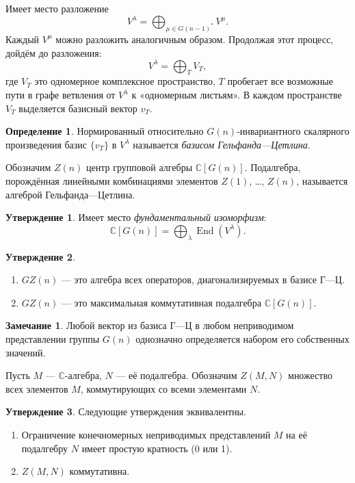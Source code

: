 \documentclass[12pt]{article}%
\renewcommand{\C}{\ensuremath{\mathbb C}}
\DeclareMathOperator{\Endo}{End}
\newcommand{\rep}[1]{#1^*}
\theoremstyle{remark}
\theoremstyle{definition}
\newtheorem{Prop}{Утверждение}
\newtheorem*{Remark}{Замечание}
\newtheorem{Def}{Определение}[section]
\begin{document}
Имеет место разложение
\[
    V^\lambda = \bigoplus_{\mu \in \rep{G(n-1)}} V^{\mu}.
\]
Каждый $V^{\mu}$ можно разложить аналогичным образом. Продолжая этот процесс,
дойдём до разложения:
\[
    V^\lambda = \bigoplus_{T}V_T,
\]
где $V_T$ это одномерное комплексное пространство, $T$ пробегает все возможные
пути в графе ветвления от $V^\lambda$ к «одномерным листьям». В каждом
пространстве $V_T$ выделяется базисный вектор $v_T$.

\begin{Def}
Нормированный относительно $G(n)$-инвариантного скалярного произведения базис
$\{v_T\}$ в $V^\lambda$ называется \emph{базисом Гельфанда—Цетлина}.
\end{Def}

Обозначим $Z(n)$ центр групповой алгебры $\C[G(n)]$. Подалгебра, порождённая
линейными комбинациями элементов $Z(1)$, \ldots , $Z(n)$, называется
алгеброй Гельфанда—Цетлина.

\begin{Prop}
Имеет место \emph{фундаментальный изоморфизм}:
\[
    \C[G(n)] = \bigoplus_{\lambda} \Endo(V^\lambda).
\]
\end{Prop}

\begin{Prop}
\begin{enumerate} $GZ(n)$ имеет следующие характеризации:  
  \item $GZ(n)$ — это алгебра всех операторов, диагонализируемых в базисе Г—Ц.
  
  \item $GZ(n)$ — это максимальная коммутативная подалгебра $\C[G(n)]$. 
\end{enumerate}
\end{Prop}

\begin{Remark}
Любой вектор из базиса Г—Ц в любом неприводимом представлении группы
$G(n)$ однозначно определяется набором его собственных значений.
\end{Remark}


Пусть $M$ — $\C$-алгебра, $N$ — её подалгебра. Обозначим $Z(M,N)$ множество всех
элементов $M$, коммутирующих со всеми элементами $N$.

\begin{Prop}
Следующие утверждения эквивалентны.
\begin{enumerate}
  \item Ограничение конечномерных неприводимых представлений $M$ на её
  подалгебру $N$ имеет простую кратность (0 или 1).
  \item $Z(M,N)$ коммутативна.
\end{enumerate}
\end{Prop} 
\end{document}
